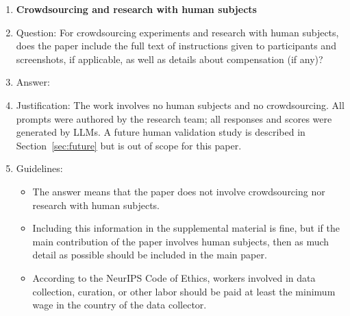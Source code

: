 \begin{enumerate}
\item {\bf Crowdsourcing and research with human subjects}
    \item[] Question: For crowdsourcing experiments and research with human subjects, does the paper include the full text of instructions given to participants and screenshots, if applicable, as well as details about compensation (if any)?
    \item[] Answer: \answerNA{}
    \item[] Justification: The work involves no human subjects and no crowdsourcing. All prompts were authored by the research team; all responses and scores were generated by LLMs. A future human validation study is described in Section~\ref{sec:future} but is out of scope for this paper.
    \item[] Guidelines:
    \begin{itemize}
        \item The answer \answerNA{} means that the paper does not involve crowdsourcing nor research with human subjects.
        \item Including this information in the supplemental material is fine, but if the main contribution of the paper involves human subjects, then as much detail as possible should be included in the main paper.
        \item According to the NeurIPS Code of Ethics, workers involved in data collection, curation, or other labor should be paid at least the minimum wage in the country of the data collector.
    \end{itemize}


\end{enumerate}
